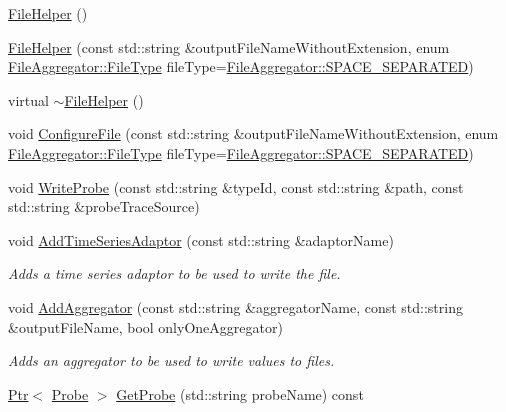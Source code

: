 \begin{DoxyCompactItemize}
\item 
\hyperlink{classns3_1_1FileHelper_a490be12d5c7fc07ea4ba574c0bbc88ba}{File\+Helper} ()
\item 
\hyperlink{classns3_1_1FileHelper_a11feedb8a5454986e8deeccd1d713bbb}{File\+Helper} (const std\+::string \&output\+File\+Name\+Without\+Extension, enum \hyperlink{classns3_1_1FileAggregator_aedb3108205a498f7ac0c564508067e2d}{File\+Aggregator\+::\+File\+Type} file\+Type=\hyperlink{classns3_1_1FileAggregator_aedb3108205a498f7ac0c564508067e2daa06fea1225d5be6eefc92c12abc4bd0b}{File\+Aggregator\+::\+S\+P\+A\+C\+E\+\_\+\+S\+E\+P\+A\+R\+A\+T\+ED})
\item 
virtual \hyperlink{classns3_1_1FileHelper_ac99655719b4b32c85fe97ef7641729d9}{$\sim$\+File\+Helper} ()
\item 
void \hyperlink{classns3_1_1FileHelper_acdc8c6b99c855273ae9259fda82b7428}{Configure\+File} (const std\+::string \&output\+File\+Name\+Without\+Extension, enum \hyperlink{classns3_1_1FileAggregator_aedb3108205a498f7ac0c564508067e2d}{File\+Aggregator\+::\+File\+Type} file\+Type=\hyperlink{classns3_1_1FileAggregator_aedb3108205a498f7ac0c564508067e2daa06fea1225d5be6eefc92c12abc4bd0b}{File\+Aggregator\+::\+S\+P\+A\+C\+E\+\_\+\+S\+E\+P\+A\+R\+A\+T\+ED})
\item 
void \hyperlink{classns3_1_1FileHelper_a365494ad1ae02d54ac2e3a134a101d2b}{Write\+Probe} (const std\+::string \&type\+Id, const std\+::string \&path, const std\+::string \&probe\+Trace\+Source)
\item 
void \hyperlink{classns3_1_1FileHelper_a0f946e4ecd03d5d1aa00b7f851bde702}{Add\+Time\+Series\+Adaptor} (const std\+::string \&adaptor\+Name)
\begin{DoxyCompactList}\small\item\em Adds a time series adaptor to be used to write the file. \end{DoxyCompactList}\item 
void \hyperlink{classns3_1_1FileHelper_a8aed14bd67ec9d0cc15a9ed43a4635df}{Add\+Aggregator} (const std\+::string \&aggregator\+Name, const std\+::string \&output\+File\+Name, bool only\+One\+Aggregator)
\begin{DoxyCompactList}\small\item\em Adds an aggregator to be used to write values to files. \end{DoxyCompactList}\item 
\hyperlink{classns3_1_1Ptr}{Ptr}$<$ \hyperlink{classns3_1_1Probe}{Probe} $>$ \hyperlink{classns3_1_1FileHelper_ae52196dc5fee4d85fed92494f6912603}{Get\+Probe} (std\+::string probe\+Name) const 

\end{DoxyCompactItemize}
